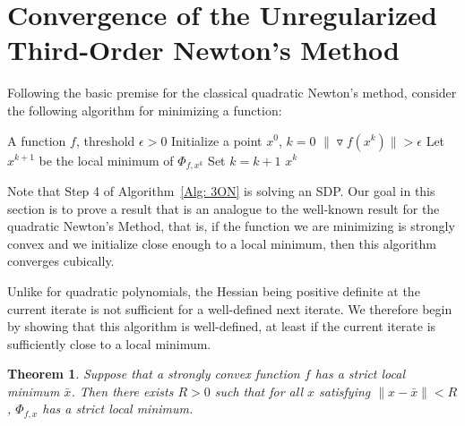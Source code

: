 \documentclass[11pt]{article}
\theoremstyle{plain}
\newtheorem{theorem}{Theorem}[section]
\theoremstyle{definition}
\theoremstyle{remark}
\def \xbar{\bar{x}}
\def \grad{\triangledown}
\begin{document}
\section{Convergence of the Unregularized Third-Order Newton's Method}\label{Sec: Convergence}

Following the basic premise for the classical quadratic Newton's method, consider the following algorithm for minimizing a function:

\begin{algorithm}[H]
	\caption{Unregularized Third-Order Newton's Method}\label{Alg: 3ON}
	\begin{algorithmic}[1]
		 A function $f$, threshold $\epsilon > 0$
		\State Initialize a point $x^0$, $k = 0$
		 $\|\grad f(x^k)\| > \epsilon$
		\State \quad Let $x^{k+1}$ be the local minimum of $\Phi_{f,x^k}$
		\State \quad Set $k = k+1$
         $x^k$
	\end{algorithmic}
\end{algorithm}

\noindent Note that Step 4 of Algorithm~\ref{Alg: 3ON} is solving an SDP. Our goal in this section is to prove a result that is an analogue to the well-known result for the quadratic Newton's Method, that is, if the function we are minimizing is strongly convex and we initialize close enough to a local minimum, then this algorithm converges cubically.

Unlike for quadratic polynomials, the Hessian being positive definite at the current iterate is not sufficient for a well-defined next iterate. We therefore begin by showing that this algorithm is well-defined, at least if the current iterate is sufficiently close to a local minimum.

\begin{theorem}\label{Thm: Well-defined}
Suppose that a strongly convex function $f$ has a strict local minimum $\xbar$. Then there exists $R > 0$ such that for all $x$ satisfying $\|x - \xbar\| < R$, $\Phi_{f,x}$ has a strict local minimum.
\end{theorem}
\end{document}
